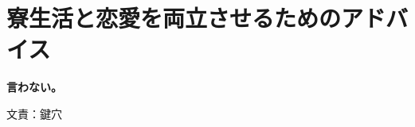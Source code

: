 

\newcommand{\RenaiRyouritsuTitle}{寮生活と恋愛を両立させるためのアドバイス}
\newcommand{\RenaiRyouritsuBigText}{%
	言わない。
}
\newcommand{\RenaiRyouritsuAuthor}{文責：鍵穴}

\clearpage

\section{\RenaiRyouritsuTitle}

\vspace*{18mm}

\begin{center}
	{\gtfamily\bfseries\fontsize{110}{120}\selectfont
		\RenaiRyouritsuBigText
	}
\end{center}

\vfill

\begin{flushright}
	{\small \RenaiRyouritsuAuthor}
\end{flushright}

\clearpage

